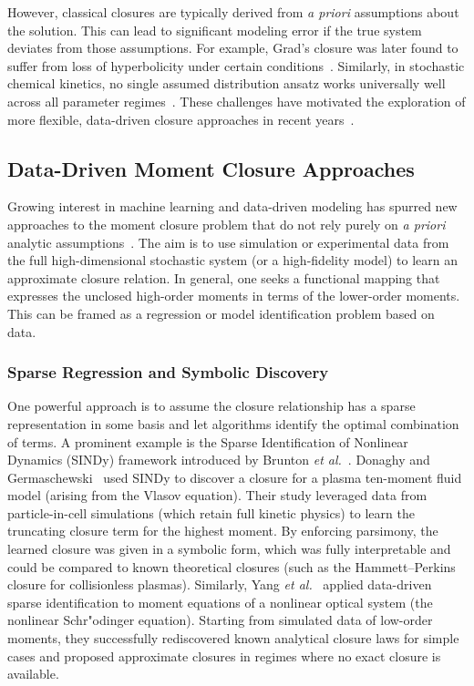 \documentclass[journal, onecolumn]{IEEEtran}
\begin{document}
However, classical closures are typically derived from \textit{a priori} assumptions about the solution. This can lead to significant modeling error if the true system deviates from those assumptions. For example, Grad’s closure was later found to suffer from loss of hyperbolicity under certain conditions~\cite{duraisamy2019turbulence}. Similarly, in stochastic chemical kinetics, no single assumed distribution ansatz works universally well across all parameter regimes~\cite{schnoerr2015comparison}. These challenges have motivated the exploration of more flexible, data-driven closure approaches in recent years~\cite{karniadakis2021physics}.

\subsection{Data-Driven Moment Closure Approaches}

Growing interest in machine learning and data-driven modeling has spurred new approaches to the moment closure problem that do not rely purely on \textit{a priori} analytic assumptions~\cite{karniadakis2021physics}. The aim is to use simulation or experimental data from the full high-dimensional stochastic system (or a high-fidelity model) to learn an approximate closure relation. In general, one seeks a functional mapping that expresses the unclosed high-order moments in terms of the lower-order moments. This can be framed as a regression or model identification problem based on data.

\subsubsection{Sparse Regression and Symbolic Discovery}

One powerful approach is to assume the closure relationship has a sparse representation in some basis and let algorithms identify the optimal combination of terms. A prominent example is the Sparse Identification of Nonlinear Dynamics (SINDy) framework introduced by Brunton \textit{et al.}~\cite{brunton2016discovering}. Donaghy and Germaschewski~\cite{donaghy2023symbolic} used SINDy to discover a closure for a plasma ten-moment fluid model (arising from the Vlasov equation). Their study leveraged data from particle-in-cell simulations (which retain full kinetic physics) to learn the truncating closure term for the highest moment. By enforcing parsimony, the learned closure was given in a symbolic form, which was fully interpretable and could be compared to known theoretical closures (such as the Hammett--Perkins closure for collisionless plasmas). Similarly, Yang \textit{et al.}~\cite{yang2024identification} applied data-driven sparse identification to moment equations of a nonlinear optical system (the nonlinear Schr"odinger equation). Starting from simulated data of low-order moments, they successfully rediscovered known analytical closure laws for simple cases and proposed approximate closures in regimes where no exact closure is available.
\end{document}
